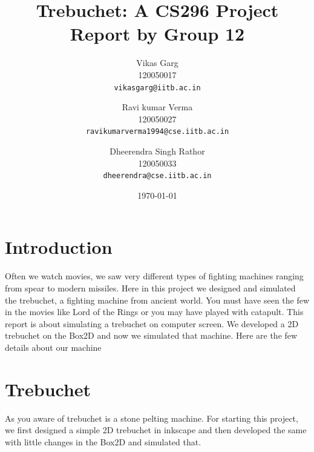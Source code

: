 \documentclass[11pt]{article}
\begin{document}
\title{\vspace{15ex}\Huge{Trebuchet: A CS296 Project Report by Group 12}\vspace{15ex}}


\author{
  Vikas Garg\\120050017\\
  \texttt{vikasgarg@iitb.ac.in}\\[1 cm]
  \and
  Ravi kumar Verma\\120050027\\
  \texttt{ravikumarverma1994@cse.iitb.ac.in}
  \and 
  Dheerendra Singh Rathor\\120050033\\
  \texttt{dheerendra@cse.iitb.ac.in}\\[1 cm]
}

\date{\today}
\maketitle
\newpage

\section{Introduction}
Often we watch movies, we saw very different types of fighting machines ranging from spear to modern missiles. Here in this project we designed and simulated the trebuchet, a fighting machine from ancient world. You must have seen the few in the movies like Lord of the Rings\cite{lotr} or you may have played with catapult. 
This report is about simulating a trebuchet\cite{trebuchet} on computer screen. We developed a 2D trebuchet on the Box2D and now we simulated that machine. Here are the few details about our machine

\section{Trebuchet}
As you aware of trebuchet is a stone pelting machine. For starting this project, we first designed a simple 2D trebuchet in inkscape and then developed the same with little changes in the Box2D and simulated that.
\end{document}
